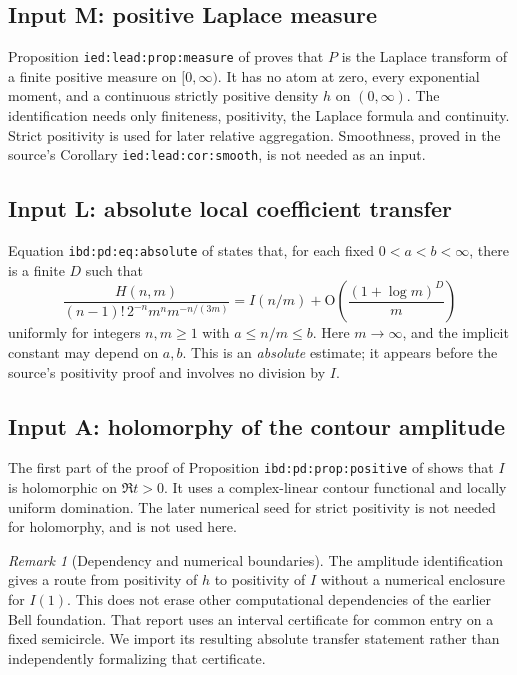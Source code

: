\documentclass[11pt,letterpaper]{article}
\theoremstyle{remark}\newtheorem{remark}[theorem]{Remark}
\newcommand{\Oh}{\mathrm O}\newcommand{\supp}{\operatorname{supp}}
\newcommand{\file}[1]{\nolinkurl{#1}}
\begin{document}
\subsection*{Input M: positive Laplace measure}
Proposition \file{ied:lead:prop:measure} of \cite{Euler} proves that $P$
is the Laplace transform of a finite positive measure on $[0,\infty)$.
It has no atom at zero, every exponential moment, and a continuous
strictly positive density $h$ on $(0,\infty)$.
The identification needs only finiteness, positivity, the Laplace
formula and continuity. Strict positivity is used for later relative
aggregation. Smoothness, proved in the source's
Corollary \file{ied:lead:cor:smooth}, is not needed as an input.

\subsection*{Input L: absolute local coefficient transfer}
Equation \file{ibd:pd:eq:absolute} of \cite{IBD} states that, for
each fixed $0<a<b<\infty$, there is a finite $D$ such that
\begin{equation}\label{ied:par:eq:LLT}
 \frac{H(n,m)}
 {(n-1)!\,2^{-n}m^n m^{-n/(3m)}}
 =I(n/m)+\Oh\!\left(\frac{(1+\log m)^D}{m}\right)
\end{equation}
uniformly for integers $n,m\ge1$ with $a\le n/m\le b$.
Here $m\to\infty$, and the implicit constant may depend on $a,b$.
This is an \emph{absolute} estimate; it appears before the source's
positivity proof and involves no division by $I$.

\subsection*{Input A: holomorphy of the contour amplitude}
The first part of the proof of Proposition
\file{ibd:pd:prop:positive} of \cite{IBD} shows that $I$ is
holomorphic on $\Re t>0$. It uses a complex-linear contour functional
and locally uniform domination. The later numerical seed for
strict positivity is not needed for holomorphy, and is not used here.

\begin{remark}[Dependency and numerical boundaries]\label{ied:par:rem:seed}
The amplitude identification gives a route from positivity of $h$ to
positivity of $I$ without a numerical enclosure for $I(1)$. This does
not erase other computational dependencies of the earlier Bell
foundation. That report uses an interval certificate for common entry
on a fixed semicircle. We import its resulting absolute transfer
statement rather than independently formalizing that certificate.
\end{remark}
\end{document}
